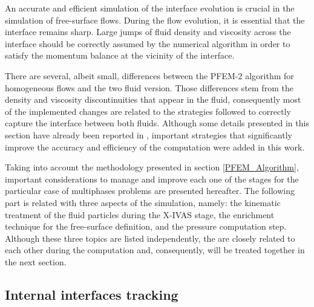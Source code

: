 An accurate and efficient simulation of the interface evolution is crucial in the simulation of free-surface flows. During the flow evolution, it is essential that the interface remains sharp. Large jumps of fluid density and viscosity across the interface should be correctly assumed by the numerical algorithm in order to satisfy the momentum balance at the vicinity of the interface.


There are several, albeit small, differences between the PFEM-2 algorithm for homogeneous flows and the two fluid version. Those differences stem from the density and viscosity discontinuities that appear in the fluid, consequently most of the implemented changes are related to the strategies followed to correctly capture the interface between both fluids. Although some details presented in this section have already been reported in \cite{Idelsohn13c}, important strategies that significantly improve the accuracy and efficiency of the computation were added in this work.

Taking into account the methodology presented in section \ref{PFEM_Algorithm}, important considerations to manage and improve each one of the stages for the particular case of multiphases problems are presented hereafter. The following part is related with three aspects of the simulation, namely: the kinematic treatment of the fluid particles during the X-IVAS stage, the enrichment technique for the free-surface definition, and the pressure computation step. Although these three topics are listed independently, the are closely related to each other during the computation and, consequently, will be treated together in the next section.

\subsection{Internal interfaces tracking}\label{sec:tracking}

